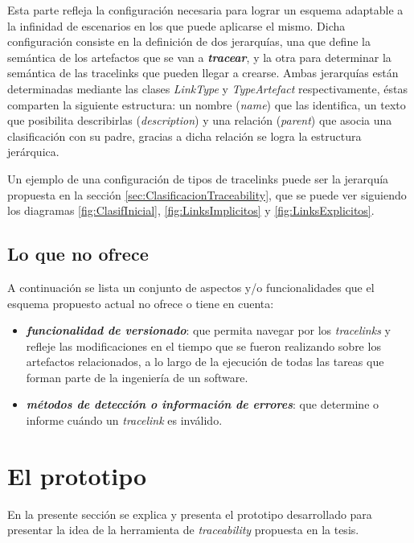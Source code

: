 \documentclass[a4paper,12pt,oneside,spanish]{book}
\begin{document}
Esta parte refleja la configuración necesaria para lograr un esquema adaptable a la infinidad de escenarios en los que puede aplicarse el mismo. Dicha configuración consiste en la definición de dos jerarquías, una que define la semántica de los artefactos que se van a \textit{\textbf{tracear}}, y la otra para determinar la semántica de las tracelinks que pueden llegar a crearse. Ambas jerarquías están determinadas mediante las clases \textsf{\textit{LinkType}} y \textsf{\textit{TypeArtefact}} respectivamente, éstas comparten la siguiente estructura: un nombre (\textsf{\textit{name}}) que las identifica, un texto que posibilita describirlas (\textsf{\textit{description}}) y una relación (\textsf{\textit{parent}}) que asocia una clasificación con su padre, gracias a dicha relación se logra la estructura jerárquica.

Un ejemplo de una configuración de tipos de tracelinks puede ser la jerarquía propuesta en la sección \ref{sec:ClasificacionTraceability}, que se puede ver siguiendo los diagramas \ref{fig:ClasifInicial}, \ref{fig:LinksImplicitos} y \ref{fig:LinksExplicitos}.


\subsection{Lo que no ofrece}

A continuación se lista un conjunto de aspectos y/o funcionalidades que el esquema propuesto actual no ofrece o tiene en cuenta:

\begin{itemize}

\item \textbf{\textit{funcionalidad de versionado}}: que permita navegar por los \textit{tracelinks} y refleje las modificaciones en el tiempo que se fueron realizando sobre los artefactos relacionados, a lo largo de la ejecución de todas las tareas que forman parte de la ingeniería de un software.

\item \textbf{\textit{métodos de detección o información de errores}}: que determine o informe cuándo un \textit{tracelink} es inválido.

\end{itemize}


\section{El prototipo}

En la presente sección se explica y presenta el prototipo desarrollado  para presentar la idea de la herramienta de \textit{traceability} propuesta en la tesis.
\end{document}

